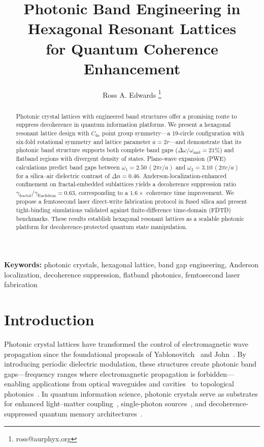 \documentclass[10pt,letterpaper]{article}
\title{Photonic Band Engineering in Hexagonal Resonant Lattices\\
for Quantum Coherence Enhancement}
\author[1]{Ross A. Edwards \orcidlink{0009-0008-0539-1289}\thanks{ross@aurphyx.org}}
\affil[1]{Aurphyx LLC}
\date{}
\begin{document}
\begin{abstract}
	Photonic crystal lattices with engineered band structures offer a promising route to suppress decoherence in quantum information platforms. We present a hexagonal resonant lattice design with $C_{6v}$ point group symmetry---a 19-circle configuration with six-fold rotational symmetry and lattice parameter $a = 2r$---and demonstrate that its photonic band structure supports both complete band gaps ($\Delta\omega/\omega_\mathrm{mid} = 21\%$) and flatband regions with divergent density of states. Plane-wave expansion (PWE) calculations predict band gaps between $\omega_1 = 2.50\,(2\pi c/a)$ and $\omega_2 = 3.10\,(2\pi c/a)$ for a silica--air dielectric contrast of $\Delta n = 0.46$. Anderson-localization-enhanced confinement on fractal-embedded sublattices yields a decoherence suppression ratio $\gamma_\mathrm{fractal}/\gamma_\mathrm{Euclidean} = 0.63$, corresponding to a $1.6\times$ coherence time improvement. We propose a femtosecond laser direct-write fabrication protocol in fused silica and present tight-binding simulations validated against finite-difference time-domain (FDTD) benchmarks. These results establish hexagonal resonant lattices as a scalable photonic platform for decoherence-protected quantum state manipulation.
\end{abstract}

\maketitle

\noindent\textbf{Keywords:} photonic crystals, hexagonal lattice, band gap engineering, Anderson localization, decoherence suppression, flatband photonics, femtosecond laser fabrication


\section{Introduction}
\label{sec:introduction}

Photonic crystal lattices have transformed the control of electromagnetic wave propagation since the foundational proposals of Yablonovitch~\cite{Yablonovitch1987} and John~\cite{John1987}. By introducing periodic dielectric modulation, these structures create photonic band gaps---frequency ranges where electromagnetic propagation is forbidden---enabling applications from optical waveguides and cavities~\cite{Joannopoulos2008} to topological photonics~\cite{Ozawa2019,Haldane2008}. In quantum information science, photonic crystals serve as substrates for enhanced light--matter coupling~\cite{Aspuru2012}, single-photon sources~\cite{Aharonovich2016}, and decoherence-suppressed quantum memory architectures~\cite{Childress2006}.
\end{document}

